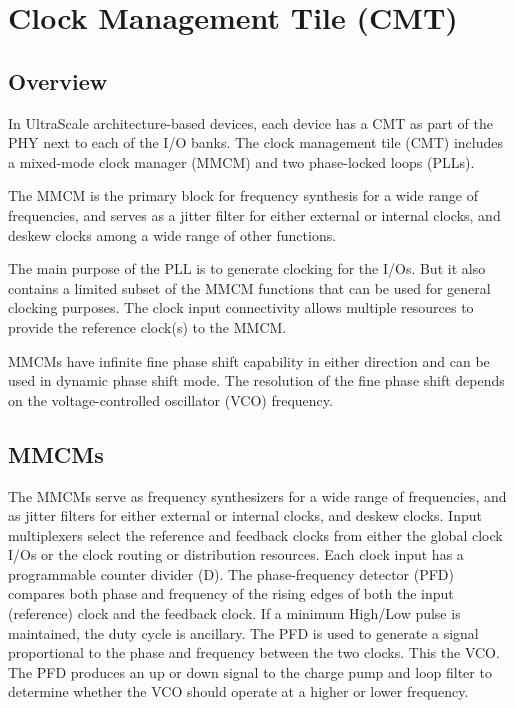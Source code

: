 \documentclass[12pt, a4paper]{report}
\begin{document}
    \section{Clock Management Tile (CMT)}
    \subsection{Overview}
    In UltraScale architecture-based devices, each device has a CMT as part of the PHY next to each of the I/O banks. The clock management tile (CMT) includes a mixed-mode clock manager (MMCM) and two phase-locked loops (PLLs). 

    The MMCM is the primary block for frequency synthesis for a wide range of frequencies, and serves as a jitter filter for either external or internal clocks, and deskew clocks among a wide range of other functions.
    
    The main purpose of the PLL is to generate clocking for the I/Os. But it also contains a limited subset of the MMCM functions that can be used for general clocking purposes. The clock input connectivity allows multiple resources to provide the reference clock(s) to the MMCM. 
    
    MMCMs have infinite fine phase shift capability in either direction and can be used in dynamic phase shift mode. The resolution of the fine phase shift depends on the voltage-controlled oscillator (VCO)
    frequency.

    \subsection{MMCMs}
    The MMCMs serve as frequency synthesizers for a wide range of frequencies, and as jitter filters for either external or internal clocks, and deskew clocks. Input multiplexers select the reference and feedback clocks from either the global clock I/Os or the clock routing or distribution resources. Each clock input has a programmable counter divider (D). The phase-frequency detector (PFD) compares both phase and frequency of the rising edges of both the input (reference) clock and the feedback clock. If
    a minimum High/Low pulse is maintained, the duty cycle is ancillary. The PFD is used to
    generate a signal proportional to the phase and frequency between the two clocks. This
    the VCO. The PFD produces an up or down signal to the charge pump and loop filter to
    determine whether the VCO should operate at a higher or lower frequency.
    
\end{document}
